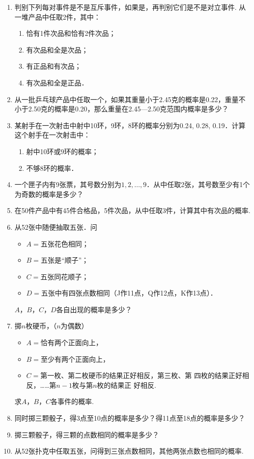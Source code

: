 \begin{ex}
\begin{enumerate}
    \item 判别下列每对事件是不是互斥事件，如果是，再判别它们是不是对立事件.
从一堆产品中任取2件，其中：
\begin{enumerate}[(1)]
\item 恰有1件次品和恰有2件次品；
\item 有次品和全是次品；
\item 有正品和有次品；
\item 有次品和全是正品．
\end{enumerate}

\item 从一批乒乓球产品中任取一个，如果其重量小于2.45克的概率是0.22，重量不小于2.50克的概率是0.20，那么重量在2.45—2.50克范围内概率是多少？
\item 某射手在一次射击中射中10环，9环，8环的概率分别为0.24, 0.28, 0.19．计算这个射手在一次射击中：
\begin{enumerate}[(1)]
    \item 射中10环或9环的概率；
    \item 不够8环的概率．
\end{enumerate}

\item 一个匣子内有9张票，其号数分别为$1,2,\ldots,9$．从中任取2张，其号数至少有1个为奇数的概率是多少？
\item 在50件产品中有45件合格品，5件次品，从中任取3件，计算其中有次品的概率.
\item 从52张中随便抽取五张．问
\begin{itemize}
\item $A=$五张花色相同；
\item $B=$五张是“顺子”；
\item $C=$五张同花顺子；
\item $D=$五张中有四张点数相同（J作11点，Q作12点，K作13点）．
\end{itemize}
$A$，$B$，$C$，$D$各自出现的概率是多少？
\item 掷$n$枚硬币，（$n$为偶数）
\begin{itemize}
\item $A=$恰有两个正面向上，
\item $B=$至少有两个正面向上，
\item $C=$第一枚、第二枚硬币的结果正好相反，第三枚、第
四枚的结果正好相反，……第$n-1$枚与第$n$枚的结果正
好相反.
\end{itemize}
求$A$，$B$，$C$各事件的概率.
\item 同时掷三颗骰子，得3点至10点的概率是多少？得11点至18点的概率是多少？
\item 掷三颗骰子，得三颗的点数相同的概率是多少？
\item 从52张扑克中任取五张，问得到三张点数相同，其他两张点数也相同的概率.
\end{enumerate}
\end{ex}

